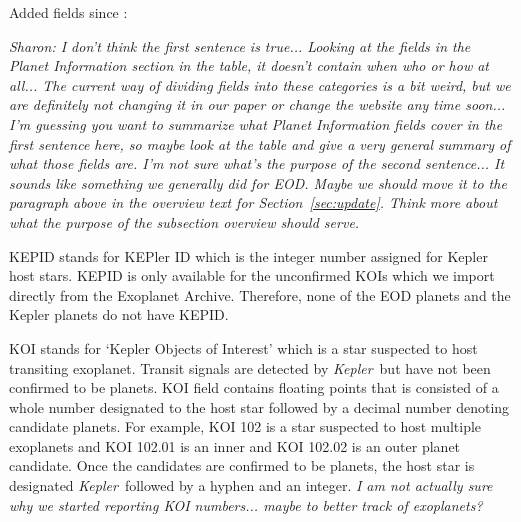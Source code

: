 \documentclass[11pt,preprint]{aastex}
\def\kepler{\textit{Kepler}}
\begin{document}
\begin{CJK*}{UTF8}{gbsn}
Added fields since \cite{Wright2011}:

\textit{Sharon: I don't think the first sentence is true... Looking at
  the fields in the Planet Information section in the table, it
  doesn't contain when who or how at all... The current way of
  dividing fields into these categories is a bit weird, but we are
  definitely not changing it in our paper or change the website any
  time soon... I'm guessing you want to summarize what Planet
  Information fields cover in the first sentence here, so maybe look
  at the table and give a very general summary of what those fields
  are.
  I'm not sure what's the purpose of the second sentence... It sounds
  like something we generally did for EOD. Maybe we should move it to
  the paragraph above in the overview text for
  Section~\ref{sec:update}. Think more about what the purpose of the
  subsection overview should serve.}


KEPID stands for KEPler ID which is the integer number assigned for Kepler host stars. KEPID is only available for the unconfirmed KOIs which we import directly from the Exoplanet Archive. Therefore, none of the EOD planets and the Kepler planets do not have KEPID.


KOI stands for `Kepler Objects of Interest' which is a star suspected to host transiting exoplanet. Transit signals are detected by \kepler\ but have not been confirmed to be planets. KOI field contains floating points that is consisted of a whole number designated to the host star followed by a decimal number denoting candidate planets. For example, KOI 102 is a star suspected to host multiple exoplanets and KOI 102.01 is an inner and KOI 102.02 is an outer planet candidate. Once the candidates are confirmed to be planets, the host star is designated \kepler\ followed by a hyphen and an integer. 
\textit {I am not actually sure why we started reporting KOI numbers... maybe to better track of exoplanets?}


\end{CJK*}
\end{document}
